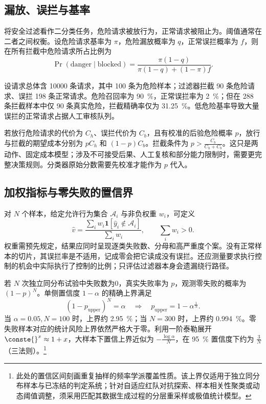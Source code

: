 \documentclass[../textbook.tex]{subfiles}
\begin{document}
\subsection{漏放、误拦与基率}


将安全过滤看作二分类任务，危险请求被放行为，正常请求被阻止为。阈值通常在二者之间权衡。设危险请求基率为 $\pi$，危险漏放概率为 $q$，正常误拦概率为 $f$，则在所有拦截中危险请求所占比例为
\begin{equation}
 \Pr(\mathrm{danger}\mid\mathrm{blocked})
 =\frac{\pi(1-q)}{\pi(1-q)+(1-\pi)f}.
\end{equation}
\begin{example}[低基率下的拦截精确率]
设请求总体含 10000 条请求，其中 100 条为危险样本；过滤器拦截 90 条危险请求、误拦 198 条正常请求。危险召回率为 \qty{90}{\percent}，正常误拦率为 \qty{2}{\percent}；但在 288 条拦截样本中仅 90 条真实危险，拦截精确率仅为 \qty{31.25}{\percent}。低危险基率导致大量误拦的正常请求占据人工审核队列。
\end{example}

若放行危险请求的代价为 $C_h$、误拦代价为 $C_b$，且有校准的后验危险概率 $p$，放行与拦截的期望成本分别为 $pC_h$ 和 $(1-p)C_b$。拦截条件为 $p>\frac{C_b}{C_h+C_b}$。这只是两动作、固定成本模型；涉及不可接受后果、人工复核和部分能力限制时，需要更完整决策规则。分类器原始分数需要先校准才能作为 $p$ 代入。

\subsection{加权指标与零失败的置信界}
对 $N$ 个样本，给定允许行为集合 $\mathcal A_i$ 与非负权重 $w_i$，可定义
\begin{equation}
 \widehat v=\frac{\sum_iw_i\mathbf1[\widehat y_i\notin\mathcal A_i]}{\sum_iw_i},
 \qquad \sum_iw_i>0.
\end{equation}
权重需预先规定，结果应同时呈现逐类失败数、分母和高严重度个案。没有正常样本的切片，其误拦率是不适用，记成零会把它读成没有误拦。还应测量要求执行控制的机会中实际执行了控制的比例；只评估过滤器本身会遗漏绕行路径。

若 $N$ 次独立同分布试验中失败数为0，真实失败率为 $p$，观测零失败的概率为 $(1-p)^N$。单侧置信度 $1-\alpha$ 的精确上界满足
\begin{equation}
 (1-p_{\mathrm{upper}})^N=\alpha
 \quad\Longrightarrow\quad
 p_{\mathrm{upper}}=1-\alpha^{\frac{1}{N}}.
\end{equation}
当 $\alpha=0.05,N=100$ 时，上界约 \qty{2.95}{\percent}；当 $N=300$ 时，上界约 \qty{0.994}{\percent}。零失败样本对应的统计风险上界依然严格大于零。利用一阶泰勒展开 $\conste{}^x\approx1+x$，大样本下置信上界近似为 $-\frac{\log\alpha}{N}$，在 \qty{95}{\percent} 置信度下约为 $\frac{3}{N}$（三法则）。\footnote{此处的置信区间刻画重复抽样的频率学派覆盖性质。该上界仅适用于独立同分布样本与已冻结的判定系统；针对自适应红队对抗探索、样本相关性聚类或动态阈值调整，须采用匹配其数据生成过程的分层重采样或极值统计模型。}
\end{document}
